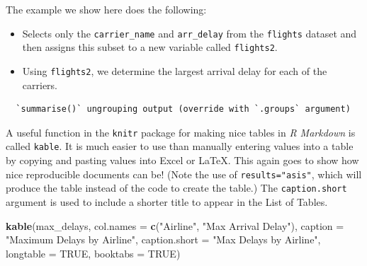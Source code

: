 \documentclass[msc,numbers]{coppe}
\newenvironment{Shaded}{\begin{snugshade}}{\end{snugshade}}
\newcommand{\DataTypeTok}[1]{\textcolor[rgb]{0.13,0.29,0.53}{#1}}
\newcommand{\KeywordTok}[1]{\textcolor[rgb]{0.13,0.29,0.53}{\textbf{#1}}}
\newcommand{\NormalTok}[1]{#1}
\newcommand{\OperatorTok}[1]{\textcolor[rgb]{0.81,0.36,0.00}{\textbf{#1}}}
\newcommand{\OtherTok}[1]{\textcolor[rgb]{0.56,0.35,0.01}{#1}}
\newcommand{\StringTok}[1]{\textcolor[rgb]{0.31,0.60,0.02}{#1}}
\begin{document}
  The example we show here does the following:
  \begin{itemize}
  \item
    Selects only the \texttt{carrier\_name} and \texttt{arr\_delay} from the \texttt{flights} dataset and then assigns this subset to a new variable called \texttt{flights2}.
  \item
    Using \texttt{flights2}, we determine the largest arrival delay for each of the carriers.
  \end{itemize}
  \begin{Shaded}
  \end{Shaded}
  \begin{verbatim}
  `summarise()` ungrouping output (override with `.groups` argument)
  \end{verbatim}
  A useful function in the \texttt{knitr} package for making nice tables in \emph{R Markdown} is called \texttt{kable}. It is much easier to use than manually entering values into a table by copying and pasting values into Excel or LaTeX. This again goes to show how nice reproducible documents can be! (Note the use of \texttt{results="asis"}, which will produce the table instead of the code to create the table.) The \texttt{caption.short} argument is used to include a shorter title to appear in the List of Tables.
  \begin{Shaded}
  \begin{Highlighting}[]
  \KeywordTok{kable}\NormalTok{(max_delays, }
        \DataTypeTok{col.names =} \KeywordTok{c}\NormalTok{(}\StringTok{"Airline"}\NormalTok{, }\StringTok{"Max Arrival Delay"}\NormalTok{),}
        \DataTypeTok{caption =} \StringTok{"Maximum Delays by Airline"}\NormalTok{,}
        \DataTypeTok{caption.short =} \StringTok{"Max Delays by Airline"}\NormalTok{,}
        \DataTypeTok{longtable =} \OtherTok{TRUE}\NormalTok{,}
        \DataTypeTok{booktabs =} \OtherTok{TRUE}\NormalTok{)}
  \end{Highlighting}
  \end{Shaded}
\end{document}
